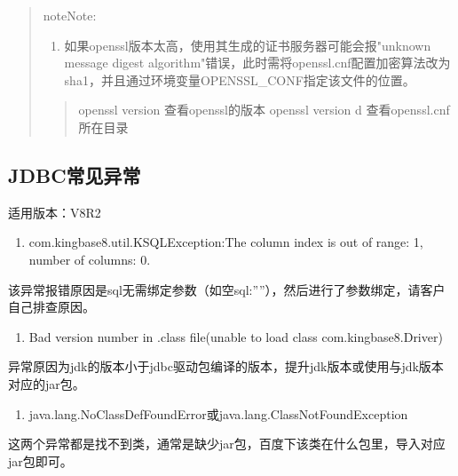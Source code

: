 \documentclass[letterpaper,10pt,english]{sphinxmanual}
\begin{document}
\begin{quote}
\begin{sphinxadmonition}{note}{Note:}
\begin{enumerate}
\end{enumerate}
\end{sphinxadmonition}
\begin{enumerate}
%
\setcounter{enumi}{3}
\item {} 
如果openssl版本太高，使用其生成的证书服务器可能会报"unknown message digest algorithm"错误，此时需将openssl.cnf配置加密算法改为sha1，并且通过环境变量OPENSSL\_CONF指定该文件的位置。

\end{enumerate}
\begin{quote}

openssl version      查看openssl的版本
openssl version \sphinxhyphen{}d   查看openssl.cnf所在目录
\end{quote}
\end{quote}


\subsection{JDBC常见异常}
\label{\detokenize{interface/jdbc:id14}}
适用版本：V8R2
\begin{enumerate}
%
\item {} 
com.kingbase8.util.KSQLException:The column index is out of range: 1, number of columns: 0.

\end{enumerate}

该异常报错原因是sql无需绑定参数（如空sql:””），然后进行了参数绑定，请客户自己排查原因。
\begin{enumerate}
%
\setcounter{enumi}{1}
\item {} 
Bad version number in .class file(unable to load class com.kingbase8.Driver)

\end{enumerate}

异常原因为jdk的版本小于jdbc驱动包编译的版本，提升jdk版本或使用与jdk版本对应的jar包。
\begin{enumerate}
%
\setcounter{enumi}{2}
\item {} 
java.lang.NoClassDefFoundError或java.lang.ClassNotFoundException

\end{enumerate}

这两个异常都是找不到类，通常是缺少jar包，百度下该类在什么包里，导入对应jar包即可。
\end{document}
